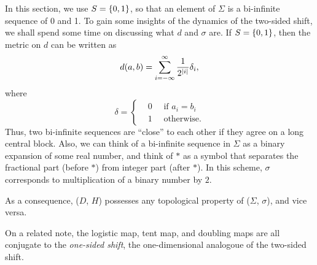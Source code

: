 \documentclass[12pt,twoside,draft]{book}
\begin{document}
In this section, we use $S = \left \{ 0,1 \right \}$, so that an element of $\Sigma$ is a bi-infinite sequence of 0 and 1.
To gain some insights of the dynamics of the two-sided shift, we shall spend some time on discussing what $d$ and $\sigma$ are.
If $S = \left \{ 0,1 \right \}$, then the metric on $d$ can be written as
\begin{equation*}
  d(a,b) = \sum\limits_{i = -\infty}^{\infty} \frac{1}{2^{\left | i \right |}} \delta_{i},
\end{equation*}
where
\begin{equation*}
  \delta = 
  \begin{cases}
    &0 \quad \mbox{ if } a_i = b_i  \\
    &1 \quad \mbox{ otherwise.}
  \end{cases}
\end{equation*}
Thus, two bi-infinite sequences are ``close'' to each other if they agree on a long central block.
Also, we can think of a bi-infinite sequence in $\Sigma$ as a binary expansion of some real number, and think of $*$ as a symbol that separates the fractional part (before $*$) from integer part (after $*$).
In this scheme, $\sigma$ corresponds to multiplication of a binary number by $2$.

As a consequence, ($D$, $H$) possesses any topological property of ($\Sigma$, $\sigma$), and vice versa.

On a related note, the logistic map, tent map, and doubling maps are all conjugate to the \textit{one-sided shift}, the one-dimensional analogoue of the two-sided shift.




\printindex
\end{document}
